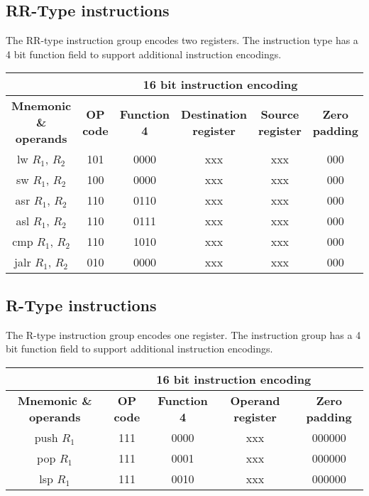 \documentclass{article}
\begin{document}
\begin{par}
	\subsection{RR-Type instructions}
	The RR-type instruction group encodes two registers. The instruction type has a 4 bit function field to support additional instruction encodings. 
	\begin{center}
		\begin{tabular}{|c|c|c|c|c|c|}
			\hline 
			& \multicolumn{5}{|c|}{\textbf{16 bit instruction encoding}} \\ 
			\hline
			\textbf{Mnemonic \& operands} & \textbf{OP code} & \textbf{Function 4} & \textbf{Destination register} & \textbf{Source register} & \textbf{Zero padding} \\
			\hline 
			lw $ R_{1} $, $ R_{2} $ & 101 & 0000 & xxx & xxx & 000 \\ 
			\hline 
			sw $ R_{1} $, $ R_{2} $ & 100 & 0000 & xxx & xxx & 000 \\ 
			\hline 
			asr $ R_{1} $, $ R_{2} $ & 110 & 0110 & xxx & xxx & 000 \\ 
			\hline
			asl $ R_{1} $, $ R_{2} $ & 110 & 0111 & xxx & xxx & 000 \\ 
			\hline
			cmp $ R_{1} $, $ R_{2} $ & 110 & 1010 & xxx & xxx & 000 \\ 
			\hline
			jalr $ R_{1} $, $ R_{2} $ & 010 & 0000 & xxx & xxx & 000 \\ 
			\hline
		\end{tabular} 
	\end{center}

	\subsection{R-Type instructions}
	The R-type instruction group encodes one register. The instruction group has a 4 bit function field to support additional instruction encodings. 
	\begin{center}
		\begin{tabular}{|c|c|c|c|c|c|}
			\hline 
			& \multicolumn{5}{|c|}{\textbf{16 bit instruction encoding}} \\ 
			\hline
			\textbf{Mnemonic \& operands} & \textbf{OP code} & \textbf{Function 4} & \textbf{Operand register} & \multicolumn{2}{|c|}{\textbf{Zero padding}} \\
			\hline 
			push $ R_{1} $ & 111 & 0000 & xxx & \multicolumn{2}{|c|}{000000} \\ 
			\hline 
			pop $ R_{1} $ & 111 & 0001 & xxx & \multicolumn{2}{|c|}{000000} \\ 
			\hline 
			lsp $ R_{1} $ & 111 & 0010 & xxx & \multicolumn{2}{|c|}{000000} \\ 
			\hline 
		\end{tabular} 
	\end{center}


\end{par}
\end{document}
